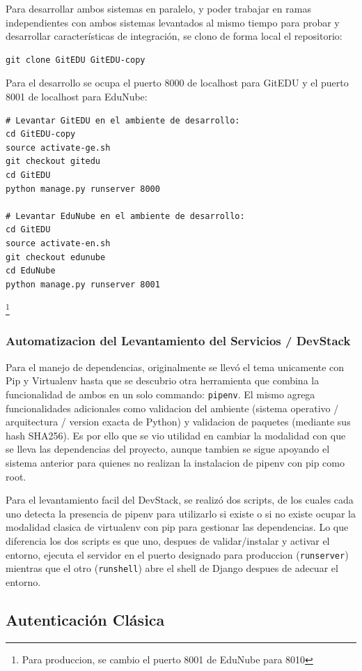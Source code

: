 Para desarrollar ambos sistemas en paralelo, y poder trabajar en ramas independientes con ambos sistemas levantados al mismo tiempo para probar y desarrollar características de integración, se clono de forma local el repositorio:
\begin{lstlisting}
git clone GitEDU GitEDU-copy
\end{lstlisting}

Para el desarrollo se ocupa el puerto 8000 de localhost para GitEDU y el puerto 8001 de localhost para EduNube:
\begin{lstlisting}
# Levantar GitEDU en el ambiente de desarrollo:
cd GitEDU-copy
source activate-ge.sh
git checkout gitedu
cd GitEDU
python manage.py runserver 8000

# Levantar EduNube en el ambiente de desarrollo:
cd GitEDU
source activate-en.sh
git checkout edunube
cd EduNube
python manage.py runserver 8001
\end{lstlisting}\footnote{Para produccion, se cambio el puerto 8001 de EduNube para 8010}

\subsubsection{Automatizacion del Levantamiento del Servicios / DevStack}
Para el manejo de dependencias, originalmente se llevó el tema unicamente con Pip y Virtualenv hasta que se descubrio otra herramienta que combina la funcionalidad de ambos en un solo commando: \texttt{pipenv}. El mismo agrega funcionalidades adicionales como validacion del ambiente (sistema operativo / arquitectura / version exacta de Python) y validacion de paquetes (mediante sus hash SHA256). Es por ello que se vio utilidad en cambiar la modalidad con que se lleva las dependencias del proyecto, aunque tambien se sigue apoyando el sistema anterior para quienes no realizan la instalacion de pipenv con pip como root.

Para el levantamiento facil del DevStack, se realizó dos scripts, de los cuales cada uno detecta la presencia de pipenv para utilizarlo si existe o si no existe ocupar la modalidad clasica de virtualenv con pip para gestionar las dependencias. Lo que diferencia los dos scripts es que uno, despues de validar/instalar y activar el entorno, ejecuta el servidor en el puerto designado para produccion (\texttt{runserver}) mientras que el otro (\texttt{runshell}) abre el shell de Django despues de adecuar el entorno.

\subsection{Autenticación Clásica}

